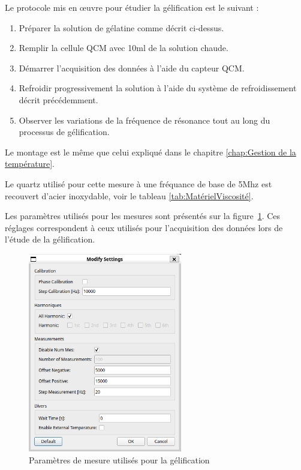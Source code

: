 Le protocole mis en œuvre pour étudier la gélification est le suivant :
\begin{enumerate}
    \item Préparer la solution de gélatine comme décrit ci-dessus.
    \item Remplir la cellule QCM avec 10ml de la solution chaude.
    \item Démarrer l’acquisition des données à l’aide du capteur QCM.
    \item Refroidir progressivement la solution à l’aide du système de refroidissement décrit précédemment.
    \item Observer les variations de la fréquence de résonance tout au long du processus de gélification.
\end{enumerate}
Le montage est le même que celui expliqué dans le chapitre \ref{chap:Gestion de la température}.

Le quartz utilisé pour cette mesure à une fréquance de base de 5Mhz est recouvert d'acier inoxydable, voir le tableau \ref{tab:MatérielViscosité}.

Les paramètres utilisés pour les mesures sont présentés sur la figure~\ref{fig:SettingsGelification}. Ces réglages correspondent à ceux utilisés pour l'acquisition des données lors de l'étude de la gélification.

\begin{figure}[H]
    \centering
    \includegraphics[width=0.6\textwidth]{assets/figures/SettingsWater-Ethanol.png}
    \caption{Paramètres de mesure utilisés pour la gélification}
    \label{fig:SettingsGelification}
\end{figure}

